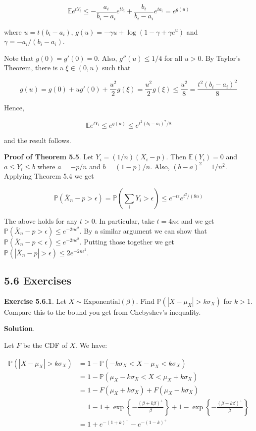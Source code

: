 \[ \mathbb{E}e^{tY_{i}} \leq - \frac{a_{i}}{b_{i} - a_{i}} e^{tb_{i}} + \frac{b_{i}}{b_{i} - a_{i}} e^{ta_{i}} = e^{g(u)} \]

where \(u = t(b_{i} - a_{i})\),
\(g(u) = -\gamma u + \log (1 - \gamma + \gamma e^u)\) and
\(\gamma = -a_{i} / (b_{i} - a_{i})\).

Note that \(g(0) = g'(0) = 0\). Also, \(g''(u) \leq 1/4\) for all
\(u > 0\). By Taylor's Theorem, there is a \(\xi \in (0, u)\) such that

\[ g(u) = g(0) + u g'(0) + \frac{u^{2}}{2} g(\xi) = \frac{u^{2}}{2} g(\xi) \leq \frac{u^{2}}{8} = \frac{t^{2}(b_{i} - a_{i})^{2}}{8} \]

Hence,

\[ \mathbb{E}e^{tY_{i}} \leq e^{g(u)} \leq e^{t^{2}(b_{i} - a_{i})^{2}/8} \]

and the result follows.

\textbf{Proof of Theorem 5.5}. Let \(Y_{i} = (1 / n)(X_{i} - p)\). Then
\(\mathbb{E}(Y_{i}) = 0\) and \(a \leq Y_{i} \leq b\) where \(a = -p/n\) and
\(b = (1 - p) / n\). Also, \((b - a)^{2} = 1/n^{2}\). Applying Theorem 5.4
we get

\[ \mathbb{P}\left(\overline{X}_{n} - p > \epsilon\right) = \mathbb{P}\left( \sum_{i} Y_{i} > \epsilon \right) \leq e^{-t\epsilon} e^{t^{2}/(8n)}\]

The above holds for any \(t > 0\). In particular, take
\(t = 4n\epsilon\) and we get
\(\mathbb{P}\left(\overline{X}_{n} - p > \epsilon\right)  \leq e^{-2n\epsilon^{2}}\).
By a similar argument we can show that
\(\mathbb{P}\left(\overline{X}_{n} - p < \epsilon\right)  \leq e^{-2n\epsilon^{2}}\).
Putting those together we get
\(\mathbb{P}\left(|\overline{X}_{n} - p| >  \epsilon\right)  \leq 2e^{-2n\epsilon^{2}}\).

\subsection*{5.6 Exercises}

\textbf{Exercise 5.6.1}. Let \(X \sim \text{Exponential}(\beta)\). Find
\(\mathbb{P}(|X - \mu_X| > k \sigma_X)\) for \(k > 1\). Compare this to
the bound you get from Chebyshev's inequality.

\textbf{Solution}.

Let \(F\) be the CDF of \(X\). We have:

\begin{align*}
\mathbb{P}(|X - \mu_X| > k \sigma_X) &= 1 - \mathbb{P}(-k \sigma_X < X - \mu_X < k \sigma_X) \\
&= 1 - \mathbb{P}(\mu_X - k \sigma_X < X < \mu_X + k \sigma_X) \\
&= 1 - F(\mu_X + k \sigma_X) + F(\mu_X - k \sigma_X) \\
&= 1 - 1 + \exp\left\{ -\frac{\left(\beta + k \beta\right)^+}{\beta} \right\} + 1 - \exp\left\{-\frac{\left(\beta - k \beta\right)^+}{\beta} \right\} \\
&= 1 + e^{-(1+k)^+ } - e^{-(1-k)^+} 
\end{align*}

